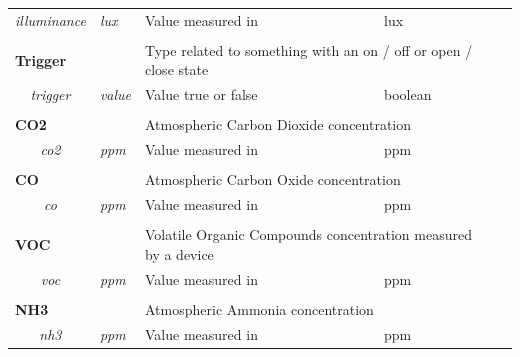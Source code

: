 \begin{landscape}
\begin{longtable}{cllll}
   \textit{illuminance}                  & \textit{lux}                       & Value measured in                                      & lux                            &  \\ [0.4em] \cline{1-4}
   \\[-0.85em]
   \multicolumn{2}{l}{\textbf{Trigger}}                                       & \multicolumn{2}{l}{Type related to something with an on / off or open / close state}    &  \\
   \textit{trigger}                      & \textit{value}                     & Value true or false                                    & boolean                        &  \\ [0.4em] \cline{1-4}
   \\[-0.85em]
   \multicolumn{2}{l}{\textbf{CO2}}                                           & \multicolumn{2}{l}{Atmospheric Carbon Dioxide concentration}                            &  \\
   \textit{co2}                          & \textit{ppm}                       & Value measured in                                      & ppm                            &  \\ [0.4em] \cline{1-4}
   \\[-0.85em]
   \multicolumn{2}{l}{\textbf{CO}}                                            & \multicolumn{2}{l}{Atmospheric Carbon Oxide concentration}                              &  \\
   \textit{co}                           & \textit{ppm}                       & Value measured in                                      & ppm                            &  \\ [0.4em] \cline{1-4}
   \\[-0.85em]
   \multicolumn{2}{l}{\textbf{VOC}}                                           & \multicolumn{2}{l}{Volatile Organic Compounds concentration measured by a device}       &  \\
   \textit{voc}                          & \textit{ppm}                       & Value measured in                                      & ppm                            &  \\ [0.4em] \cline{1-4}
   \\[-0.85em]
   \multicolumn{2}{l}{\textbf{NH3}}                                           & \multicolumn{2}{l}{Atmospheric Ammonia concentration}                                   &  \\
   \textit{nh3}                          & \textit{ppm}                       & Value measured in                                      & ppm                            &  \\ [0.4em] \cline{1-4}

\end{longtable}
\end{landscape}
